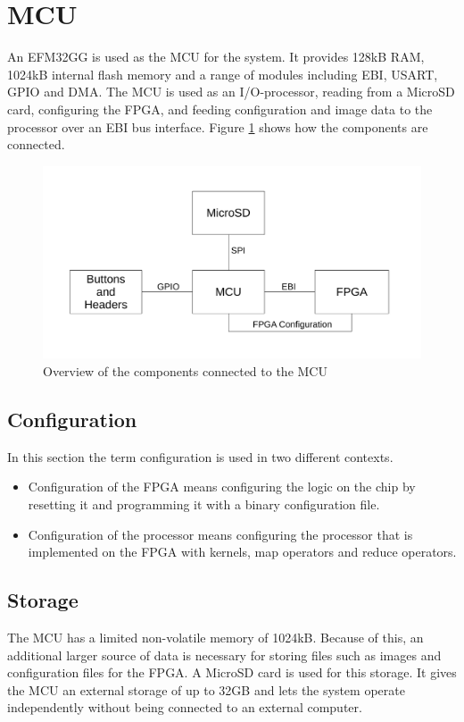 \section{MCU}
\label{sec:mcu}

An EFM32GG is used as the MCU for the system.
It provides 128kB RAM, 1024kB internal flash memory and a range of modules including EBI, USART, GPIO and DMA.
The MCU is used as an I/O-processor, reading from a MicroSD card, configuring the FPGA, and feeding configuration and image data to the processor over an EBI bus interface.
Figure \ref{fig:mcuOverview} shows how the components are connected.

\begin{figure}[h!]
    \includegraphics[width=\linewidth]{img/mcu_overview.pdf}
    \caption{Overview of the components connected to the MCU}
    \label{fig:mcuOverview}
\end{figure}

\subsection{Configuration}
In this section the term configuration is used in two different contexts.
\begin{itemize}
	\item Configuration of the FPGA means configuring the logic on the chip by resetting it and programming it with a binary configuration file.
	\item Configuration of the processor means configuring the processor that is implemented on the FPGA with kernels, map operators and reduce operators.
\end{itemize}

\subsection{Storage}
The MCU has a limited non-volatile memory of 1024kB. Because of this, an additional larger source of data is necessary for storing files such as images and configuration files for the FPGA. A MicroSD card is used for this storage. It gives the MCU an external storage of up to 32GB and lets the system operate independently without being connected to an external computer.


